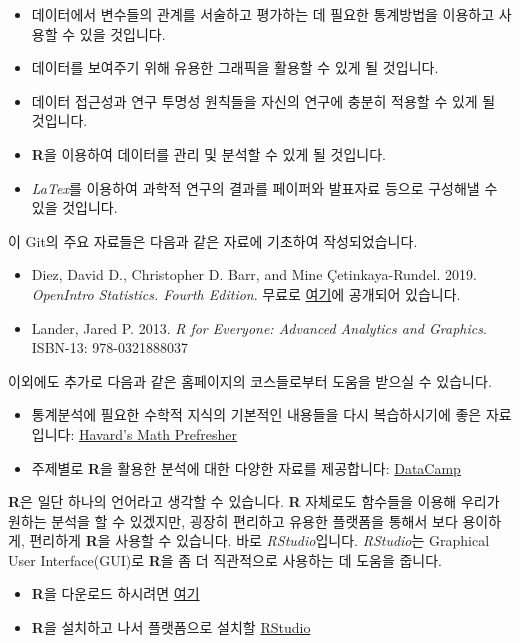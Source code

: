 \documentclass[]{book}
\providecommand{\tightlist}{%
  \setlength{\itemsep}{0pt}\setlength{\parskip}{0pt}}
\begin{document}
\begin{itemize}
\tightlist
\item
  데이터에서 변수들의 관계를 서술하고 평가하는 데 필요한 통계방법을 이용하고 사용할 수 있을 것입니다.
\item
  데이터를 보여주기 위해 유용한 그래픽을 활용할 수 있게 될 것입니다.
\item
  데이터 접근성과 연구 투명성 원칙들을 자신의 연구에 충분히 적용할 수 있게 될 것입니다.
\item
  \textbf{R}을 이용하여 데이터를 관리 및 분석할 수 있게 될 것입니다.
\item
  \emph{LaTex}를 이용하여 과학적 연구의 결과를 페이퍼와 발표자료 등으로 구성해낼 수 있을 것입니다.
\end{itemize}

이 Git의 주요 자료들은 다음과 같은 자료에 기초하여 작성되었습니다.

\begin{itemize}
\tightlist
\item
  Diez, David D., Christopher D. Barr, and Mine Çetinkaya-Rundel. 2019. \emph{OpenIntro Statistics. Fourth Edition}. 무료로 \href{https://www.openintro.org/stat/textbook.php?stat_book=os}{여기}에 공개되어 있습니다.
\item
  Lander, Jared P. 2013. \emph{R for Everyone: Advanced Analytics and Graphics}. ISBN-13: 978-0321888037
\end{itemize}

이외에도 추가로 다음과 같은 홈페이지의 코스들로부터 도움을 받으실 수 있습니다.

\begin{itemize}
\tightlist
\item
  통계분석에 필요한 수학적 지식의 기본적인 내용들을 다시 복습하시기에 좋은 자료입니다: \href{https://projects.iq.harvard.edu/prefresher}{Havard's Math Prefresher}
\item
  주제별로 \textbf{R}을 활용한 분석에 대한 다양한 자료를 제공합니다: \href{https://www.datacamp.com/courses/free-introduction-to-r}{DataCamp}
\end{itemize}

\textbf{R}은 일단 하나의 언어라고 생각할 수 있습니다. \textbf{R} 자체로도 함수들을 이용해 우리가 원하는 분석을 할 수 있겠지만, 굉장히 편리하고 유용한 플랫폼을 통해서 보다 용이하게, 편리하게 \textbf{R}을 사용할 수 있습니다. 바로 \emph{RStudio}입니다. \emph{RStudio}는 Graphical User Interface(GUI)로 \textbf{R}을 좀 더 직관적으로 사용하는 데 도움을 줍니다.

\begin{itemize}
\tightlist
\item
  \textbf{R}을 다운로드 하시려면 \href{https://cloud.r-project.org/}{여기}
\item
  \textbf{R}을 설치하고 나서 플랫폼으로 설치할 \href{https://www.rstudio.com/products/rstudio/download/\#download}{RStudio}
\end{itemize}
\end{document}
